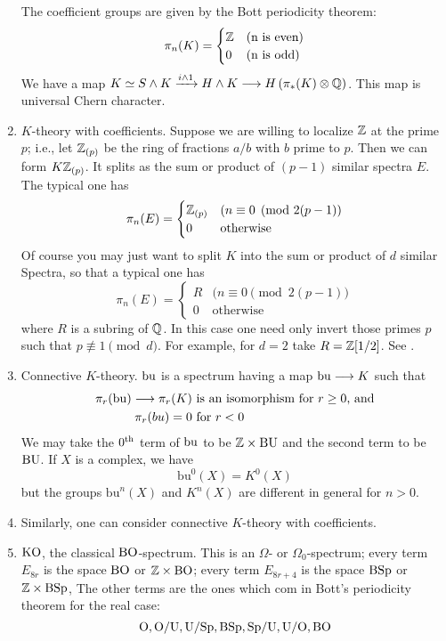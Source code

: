 \documentclass[../main]{subfiles}
\begin{document}
\begin{enumerate}[label = (\roman*)]
    The coefficient groups are given by the Bott periodicity theorem:
    \[\pi_n(K) =
    \begin{cases}
     \mathbb{Z} &\text{(n is even)} \\
     0 &\text{(n is odd)}
    \end{cases}\]
    We have a map $K\simeq S\wedge K\vra{i\wedge 1} H\wedge K \lra H\left( \pi_\ast(K)\otimes \bQ \right)$. This map is universal Chern character.
    \item $K$-theory with coefficients. Suppose we are willing to localize $\mathbb{Z}$ at the prime $p$; i.e., let $\mathbb{Z}_{(p)}$ be the ring of fractions $a/b$ with $b$ prime to $p$. Then we can form $K\mathbb{Z}_{(p)}$. It splits as the sum or product of $(p-1)$ similar spectra $E$. The typical one has
    \[\pi_n(E)=
    \begin{cases}
    \mathbb{Z}_{(p)} &(n\equiv 0 \pmod{2(p-1)} \\
    0 & \text{otherwise}
    \end{cases}\]
    Of course you may just want to split $K$ into the sum or product of $d$ similar Spectra, so that a typical one has
    \[\pi_n(E)=
    \begin{cases}
    R &(n\equiv 0 \pmod{2(p-1)} \\
    0 & \text{otherwise}
    \end{cases}\]
    where $R$ is a subring of $\mathbb{Q}$. In this case one need only invert those primes $p$ such that $p\not\equiv 1 \pmod{d}$. For example, for $d=2$ take $R=\mathbb{Z}[1/2]$. See \cite{adams3}.
    \item Connective $K$-theory. $\mathrm{bu}$ is a spectrum having a map $\mathrm{bu}\longrightarrow K$ such that
    \begin{align}
        \pi_r(\mathrm{bu})\longrightarrow\pi_r(K) &\text{ is an isomorphism for }r\geq 0 \text{, and} \nonumber \\
        \pi_r(bu)=0 &\text{ for } r<0 \nonumber
    \end{align}
    We may take the $0^{\text{th}}$ term of $\mathrm{bu}$ to be $\mathbb{Z}\times \mathrm{BU}$ and the second term to be $\mathrm{BU}$. If $X$ is a complex, we have
    \[\mathrm{bu}^0(X)=K^0(X)\]
    but the groups $\mathrm{bu}^n(X)$ and $K^n(X)$ are different in general for $n>0$.
    \item Similarly, one can consider connective $K$-theory with coefficients.
    \item $\mathrm{KO}$, the classical $\mathrm{BO}$-spectrum. This is an $\Omega$- or $\Omega_0$-spectrum; every term $E_{8r}$ is the space $\mathrm{BO}$ or $\mathbb{Z}\times \mathrm{BO}$; every term $E_{8r+4}$ is the space $\mathrm{BSp}$ or $\mathbb{Z}\times \mathrm{BSp}$, The other terms are the ones which com in Bott's periodicity theorem for the real case:
    \[\mathrm{O, O/U, U/Sp, BSp}, \mathrm{Sp}/\mathrm{U, U/O, BO}\]
    

\end{enumerate}
\end{document}
